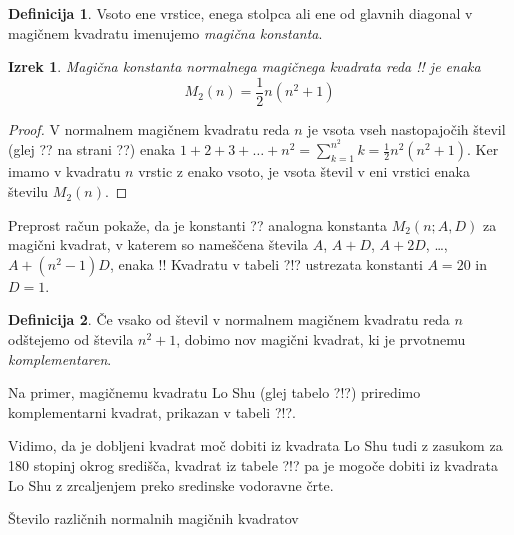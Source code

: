 \documentclass[a4paper,12pt]{article}
\theoremstyle{definition}
\newtheorem{definicija}{Definicija}
\theoremstyle{plain}
\newtheorem{izrek}{Izrek}
\begin{document}
 \begin{definicija}
      Vsoto ene vrstice, enega stolpca ali ene od glavnih diagonal
      v magičnem kvadratu imenujemo \emph{magična konstanta}.
 \end{definicija}

   \begin{izrek}
   Magična konstanta normalnega magičnega kvadrata reda !!
   je enaka
   \begin{equation}
      \label{ eq:mc}
      M_2(n) = \frac{1}{2} n(n^2+1)
   \end{equation}
\end{izrek}

\begin{proof}
      V normalnem magičnem kvadratu reda $n$ je vsota vseh nastopajočih
   števil (glej ?? na strani ??) enaka
   $1+2+3+\dots+n^2=\sum_{k=1}^{n^2}k=\frac{1}{2}n^2(n^2+1)$. Ker imamo
   v kvadratu $n$ vrstic z enako vsoto, je vsota števil v eni vrstici
   enaka številu $M_2(n)$. %
\end{proof}

Preprost račun pokaže, da je konstanti ?? analogna konstanta
$M_2(n;A,D)$ za magični kvadrat, v katerem so nameščena števila
$A$, $A+D$, $A+2D$, \dots, $A+(n^2-1)D$, enaka %
!!
Kvadratu v tabeli ?!? ustrezata konstanti $A=20$ in $D=1$.

 \begin{definicija}
      Če vsako od števil v normalnem magičnem kvadratu reda $n$ odštejemo
      od števila $n^2+1$, dobimo nov magični kvadrat, ki je prvotnemu
      \emph{komplementaren}.
 \end{definicija}

Na primer, magičnemu kvadratu Lo Shu (glej tabelo ?!?) priredimo
komplementarni kvadrat, prikazan v tabeli ?!?.
%

Vidimo, da je dobljeni kvadrat moč dobiti iz kvadrata Lo Shu tudi z zasukom za
180 stopinj okrog središča, kvadrat iz tabele ?!? pa je mogoče dobiti
iz kvadrata Lo Shu z zrcaljenjem preko sredinske vodoravne črte.

Število različnih normalnih magičnih kvadratov
\end{document}
